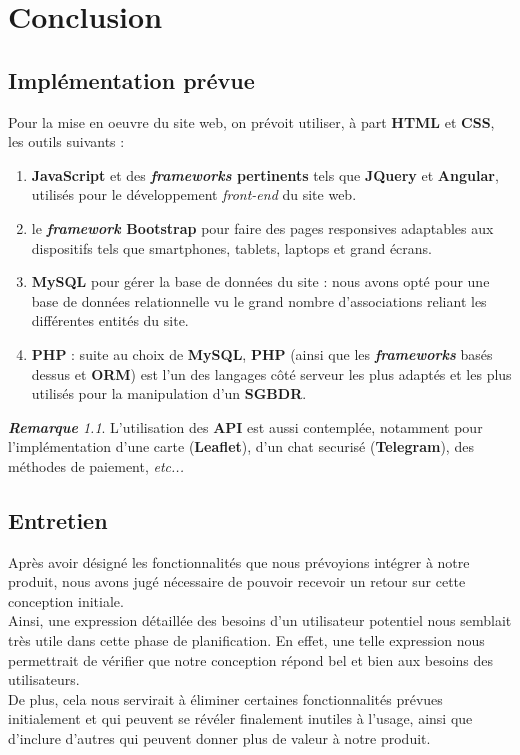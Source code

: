 \documentclass[a4paper,12pt]{report}
\theoremstyle{break}
\theoremstyle{break}
\theoremstyle{break}
\theoremstyle{break}
\theoremstyle{definition}
\theoremstyle{remark}
\newtheorem*{remark}{\textbf{Remarque}}
\begin{document}
\chapter{Conclusion}
\section{Implémentation prévue}
Pour la mise en oeuvre du site web, on prévoit utiliser, à part \textbf{HTML} et \textbf{CSS}, les outils suivants :
\begin{enumerate}
  \item{\textbf{JavaScript} et des \textbf{\textit{frameworks} pertinents} tels que \textbf{JQuery} et \textbf{Angular}, utilisés pour le développement \textit{front-end} du site web.}
  \item{le \textbf{\textit{framework} Bootstrap} pour faire des pages responsives adaptables aux dispositifs tels que smartphones, tablets, laptops et grand écrans.}
  \item{\textbf{MySQL} pour gérer la base de données du site : nous avons opté pour une base de données relationnelle vu le grand nombre d'associations reliant les différentes entités du site.}
  \item{\textbf{PHP} : suite au choix de \textbf{MySQL}, \textbf{PHP} (ainsi que les \textbf{\textit{frameworks}} basés dessus et \textbf{ORM}) est l'un des langages côté serveur les plus adaptés et les plus utilisés pour la manipulation d'un \textbf{SGBDR}.}
\end{enumerate}

\begin{remark}
L'utilisation des \textbf{API} est aussi contemplée, notamment pour l'implémentation d'une carte (\textbf{Leaflet}), d'un chat securisé (\textbf{Telegram}), des méthodes de paiement, \textit{etc...}
\end{remark}

\newpage
\section{Entretien}
Après avoir désigné les fonctionnalités que nous prévoyions intégrer à notre produit, nous avons jugé nécessaire de pouvoir recevoir un retour sur cette conception initiale.\\
Ainsi, une expression détaillée des besoins d'un utilisateur potentiel nous semblait très utile dans cette phase de planification. En effet, une telle expression nous permettrait de vérifier que notre conception répond bel et bien aux besoins des utilisateurs.\\
De plus, cela nous servirait à éliminer certaines fonctionnalités prévues initialement et qui peuvent se révéler finalement inutiles à l'usage, ainsi que d'inclure d'autres qui peuvent donner plus de valeur à notre produit.
\end{document}
